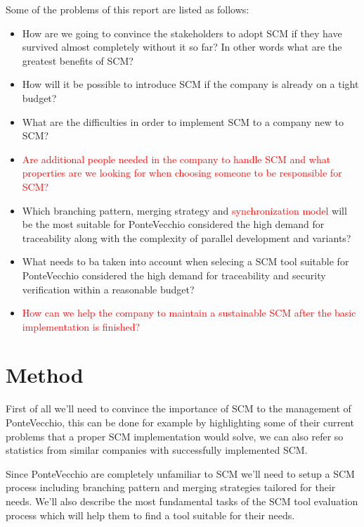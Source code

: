 \documentclass[10pt]{article}
\newcommand\remove[1]{\textcolor{red}{#1}}
\begin{document}
\hfill \break
\noindent Some of the problems of this report are  listed as follows:
\begin{itemize}
\item How are we going to convince the stakeholders to adopt SCM if they have survived almost completely without it so far? In other words what are the greatest benefits of SCM?
\item How will it be possible to introduce SCM if the company is already on a tight budget?
\item What are the difficulties in order to implement SCM to a company new to SCM?
\item \remove{Are additional people needed in the company to handle SCM and what properties are we looking for when choosing someone to be responsible for SCM?} 
\item Which branching pattern, merging strategy and \remove{synchronization model} will be the most suitable for PonteVecchio considered the high demand for traceability along with the complexity of parallel development and variants?
\item What needs to ba taken into account when selecing a SCM tool suitable for PonteVecchio considered the high demand for traceability and security verification within a reasonable budget?
\item \remove{How can we help the company to maintain a sustainable SCM after the basic implementation is finished?} 
\end{itemize}

\section{Method}
First of all we’ll need to convince the importance of SCM to the management of PonteVecchio, this can be done for example by highlighting some of their current problems that a proper SCM implementation would solve, we can also refer so statistics from similar companies with successfully implemented SCM.

\noindent Since PonteVecchio are completely unfamiliar to SCM we’ll need to setup a SCM process including branching pattern and merging strategies tailored for their needs. We’ll also describe the most fundamental tasks of the SCM tool evaluation process which will help them to find a tool suitable for their needs.
\end{document}
